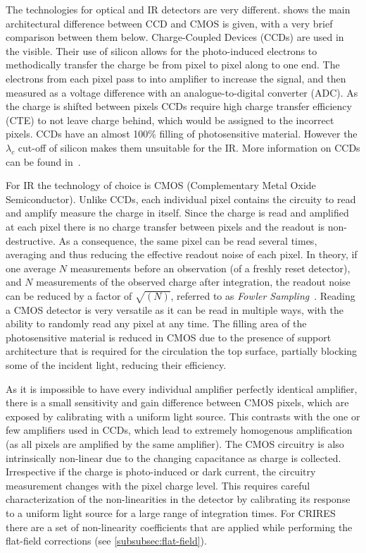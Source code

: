 The technologies for optical and {IR} detectors are very different.
 shows the main architectural difference between {CCD} and {CMOS} is given, with a very brief comparison between them below.
Charge-Coupled Devices ({CCDs}) are used in the visible.
Their use of silicon allows for the photo-induced electrons to methodically transfer the charge be from pixel to pixel along to one end.
The electrons from each pixel pass to into amplifier to increase the signal, and then measured as a voltage difference with an analogue-to-digital converter (ADC).
As the charge is shifted between pixels {CCDs} require high charge transfer efficiency (CTE) to not leave charge behind, which would be assigned to the incorrect pixels.
{CCDs} have an almost 100\% filling of photosensitive material.
However the $\lambda_c$ cut-off of silicon makes them unsuitable for the {IR}.
More information on {CCDs} can be found in~\citep{howell_handbook_2000}.

For {IR} the technology of choice is {CMOS} (Complementary Metal Oxide Semiconductor).
Unlike {CCDs}, each individual pixel contains the circuity to read and amplify measure the charge in itself.
Since the charge is read and amplified at each pixel there is no charge transfer between pixels and the readout is non-destructive.
As a consequence, the same pixel can be read several times, averaging and thus reducing the effective readout noise of each pixel.
In theory, if one average $N$ measurements before an observation (of a freshly reset detector), and $N$ measurements of the observed charge after integration, the readout noise can be reduced by a factor of $\sqrt{(N)}$, referred to as \emph{Fowler Sampling}~\citep{fowler_demonstration_1990}.
Reading a {CMOS} detector is very versatile as it can be read in multiple ways, with the ability to randomly read any pixel at any time.
The filling area of the photosensitive material is reduced in {CMOS} due to the presence of support architecture that is required for the circulation the top surface, partially blocking some of the incident light, reducing their efficiency.

As it is impossible to have every individual amplifier perfectly identical amplifier, there is a small sensitivity and gain difference between {CMOS} pixels, which are exposed by calibrating with a uniform light source.
This contrasts with the one or few amplifiers used in CCDs, which lead to extremely homogenous amplification (as all pixels are amplified by the same amplifier).
The {CMOS} circuitry is also intrinsically non-linear due to the changing capacitance as charge is collected.
Irrespective if the charge is photo-induced or dark current, the circuitry measurement changes with the pixel charge level.
This requires careful characterization of the non-linearities in the detector by calibrating its response to a uniform light source for a large range of integration times.
For CRIRES there are a set of non-linearity coefficients that are applied while performing the flat-field corrections (see \cref{subsubsec:flat-field}).

